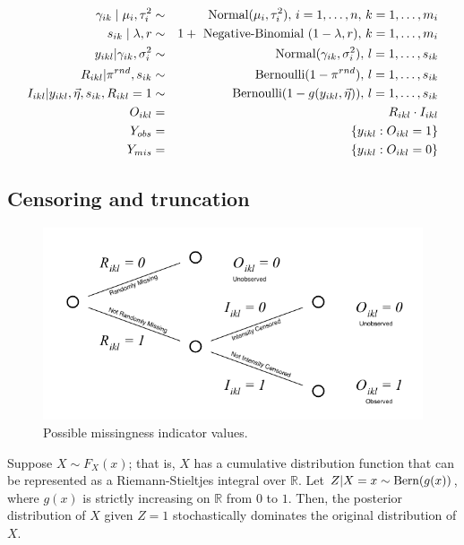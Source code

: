 \begin{eqnarray}
 \gamma_{ik}\mid\mu_{i}, \tau_{i}^2  &\sim& \hbox{Normal}(\mu_{i},\tau_{i}^{2}), \, i=1,\ldots,n, \, k=1,\ldots,m_i \\
 s_{ik} \mid \lambda, r  &\sim& 1+\hbox{ Negative-Binomial }(1-\lambda,r), \, k=1,\ldots,m_i \\
 y_{ikl} \vert \gamma_{ik}, \sigma_{i}^2   &\sim& \hbox{Normal}(\gamma_{ik},\sigma_{i}^{2}), \, l=1,\ldots,s_{ik} \\
 R_{ikl} \vert \pi^{rnd}, s_{ik} &\sim& \hbox{Bernoulli}(1 - \pi^{rnd}), \, l=1,\ldots,s_{ik} \\
 I_{ikl} \vert y_{ikl}, \vec \eta, s_{ik}, R_{ikl}=1 &\sim& \hbox{Bernoulli}(1 - g(y_{ikl}, \vec \eta)), \, l=1,\ldots,s_{ik} \\
 O_{ikl} &=& R_{ikl} \cdot I_{ikl} \\
 Y_{obs} &=& \{y_{ikl} : O_{ikl} = 1\} \\
 Y_{mis} &=& \{y_{ikl} : O_{ikl} = 0\}
\end{eqnarray}


\subsection{Censoring and truncation}

\begin{figure}%
\begin{center}
\includegraphics[width=.75\textwidth]{figures/proteomics/fig_tree_awb.pdf}
\end{center}
\caption{Possible missingness indicator values.\label{proteomics:fig:Missing_Data_Indicators_Tree}}
\end{figure}

\begin{theorem}\label{proteomics:thm:dominance}
Suppose $X \sim F_X(x)$; that is, $X$ has a cumulative distribution function that can be represented as a Riemann-Stieltjes integral over $\mathbb{R}$. Let $Z | X=x \sim \operatorname{Bern}( g(x) )$, where $g(x)$ is strictly increasing on $\mathbb{R}$ from $0$ to $1$. Then, the posterior distribution of $X$ given $Z=1$ stochastically dominates the original distribution of $X$.
\end{theorem}

